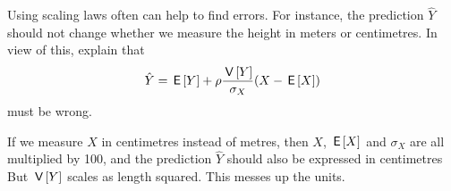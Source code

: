 \begin{exercise}
Using scaling laws often can help to find errors. For instance,  the prediction $\hat Y$ should not change whether we measure the height in meters or centimetres.
In view of this, explain that
\begin{align*}
  \hat Y = \,\mathsf{E}\left[Y\right] + \rho \frac{\,\mathsf{V}\left[Y\right]}{\sigma_X} (X - \,\mathsf{E}\left[X\right])
\end{align*}
must be wrong.
\begin{solution}
  If we measure $X$ in centimetres instead of metres, then $X$, $\,\mathsf{E}\left[X\right]$ and $\sigma_X$ are all multiplied by 100, and the prediction $\hat Y$ should also be expressed in centimetres But $\,\mathsf{V}\left[Y\right] $ scales as length squared.
  This messes up the units.
\end{solution}
\end{exercise}




